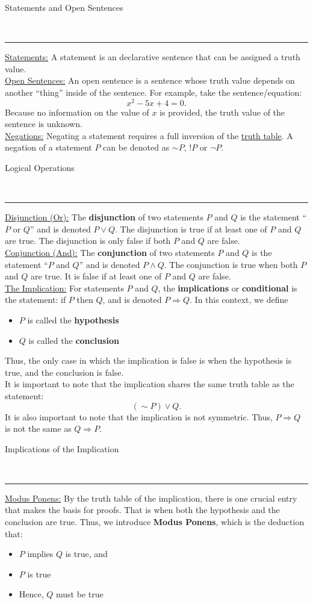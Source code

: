 \documentclass{article}
\newcommand{\header}[1]{\begin{large}\noindent #1\end{large}\\\rule{\textwidth}{0.5pt}}
\newcommand{\gap}{\medskip\\}
\newcommand{\sheader}[1]{\underline{#1:}}
\newcommand{\sgap}{\smallskip\\}
\begin{document}
\header{Statements and Open Sentences}
\sheader{Statements} A statement is an declarative sentence that can be assigned a truth value.
\gap
\sheader{Open Sentences} An open sentence is a sentence whose truth value depends on another 
``thing'' inside of the sentence. For example, take the sentence/equation:
\[
    x^2 -5x + 4 = 0.
\]
Because no information on the value of $x$ is provided, the truth value of the sentence is unknown.
\gap
\sheader{Negations} Negating a statement requires a full inversion of the \underline{truth table}. 
A negation of a statement $P$ can be denoted as $\sim P$, $!P$ or $\neg P$.
\gap
\header{Logical Operations}
\sheader{Disjunction (Or)} The \textbf{disjunction} of two statements $P$ and $Q$ is 
the statement ``$P$ or $Q$'' and is denoted $P \vee Q$. The disjunction is true if 
at least one of $P$ and $Q$ are true. The disjunction is only false if both $P$ and $Q$ are false.
\sgap
\sheader{Conjunction (And)} The \textbf{conjunction} of two statements $P$ and $Q$ is 
the statement ``$P$ and $Q$'' and is denoted $P \wedge Q$. The conjunction is true when both
$P$ and $Q$ are true. It is false if at least one of $P$ and $Q$ are false.
\gap
\sheader{The Implication} For statements $P$ and $Q$, the \textbf{implications} or \textbf{conditional}
is the statement: if $P$ then $Q$, and is denoted $P \Rightarrow Q$. In this context, we define
\begin{itemize}
    \item $P$ is called the \textbf{hypothesis}
    \item $Q$ is called the \textbf{conclusion}
\end{itemize}
Thus, the only case in which the implication is false is when the hypothesis is true, and
the conclusion is false.
\gap
It is important to note that the implication shares the same truth table as the statement:
\[
    (\sim P) \vee Q .
\]
It is also important to note that the implication is not symmetric. Thus, $P \Rightarrow Q$
is not the same as $Q \Rightarrow P$.
\gap
\header{Implications of the Implication}
\sheader{Modus Ponens} By the truth table of the implication, there is one crucial entry
that makes the basis for proofs. That is when both the hypothesis and the conclusion are true.
Thus, we introduce \textbf{Modus Ponens}, which is the deduction that:
\begin{itemize}
    \item $P$ implies $Q$ is true, and
    \item $P$ is true
    \item Hence, $Q$ must be true
\end{itemize}
\end{document}
